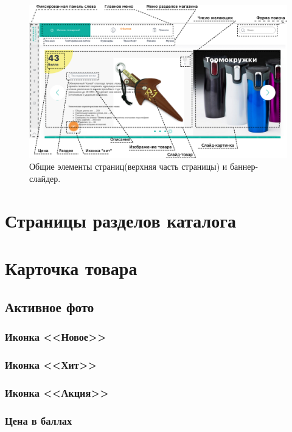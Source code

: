         \begin{figure}
            \includegraphics[width=170mm]{02_noauth_funcs/figures/01r.eps}
            \caption{Общие элементы страниц(верхняя часть страницы) и баннер-слайдер.}
            \label{fig:common_items_1}
        \end{figure}


    \section{Страницы разделов каталога}
        \label{sec:page_catalog_section}


    \section{Карточка товара}
        \label{sec:goods_cart}
        \subsection{Активное фото}
            \subsubsection{Иконка <<Новое>>}
            \subsubsection{Иконка <<Хит>>}
            \subsubsection{Иконка <<Акция>>}
            \subsubsection{Цена в баллах}
